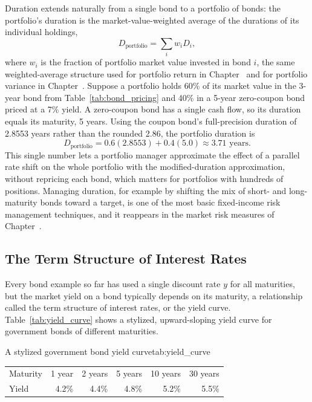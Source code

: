 \documentclass[../ai_in_finance]{subfiles}
\begin{document}
Duration extends naturally from a single bond to a portfolio of bonds: the portfolio's duration is the market-value-weighted average of the durations of its individual holdings,
\begin{equation*}
D_{\text{portfolio}} = \sum_i w_i D_i,
\end{equation*}
where $w_i$ is the fraction of portfolio market value invested in bond $i$, the same weighted-average structure used for portfolio return in Chapter~ and for portfolio variance in Chapter~. Suppose a portfolio holds 60\% of its market value in the 3-year bond from Table~\ref{tab:bond_pricing} and 40\% in a 5-year zero-coupon bond priced at a 7\% yield. A zero-coupon bond has a single cash flow, so its duration equals its maturity, 5 years. Using the coupon bond's full-precision duration of 2.8553 years rather than the rounded 2.86, the portfolio duration is
\begin{equation*}
D_{\text{portfolio}} = 0.6(2.8553) + 0.4(5.0) \approx 3.71 \text{ years}.
\end{equation*}
This single number lets a portfolio manager approximate the effect of a parallel rate shift on the whole portfolio with the modified-duration approximation, without repricing each bond, which matters for portfolios with hundreds of positions. Managing duration, for example by shifting the mix of short- and long-maturity bonds toward a target, is one of the most basic fixed-income risk management techniques, and it reappears in the market risk measures of Chapter~.

\subsection{The Term Structure of Interest Rates}
\label{sec:valuation-term-structure}

Every bond example so far has used a single discount rate $y$ for all maturities, but the market yield on a bond typically depends on its maturity, a relationship called the term structure of interest rates, or the yield curve. Table~\ref{tab:yield_curve} shows a stylized, upward-sloping yield curve for government bonds of different maturities.

\begin{booktable}[htbp]{A stylized government bond yield curve}{tab:yield_curve}
\begin{tabular}{lrrrrr}
\toprule
Maturity & 1 year & 2 years & 5 years & 10 years & 30 years \\
Yield & 4.2\% & 4.4\% & 4.8\% & 5.2\% & 5.5\% \\
\bottomrule
\end{tabular}
\end{booktable}
\end{document}
